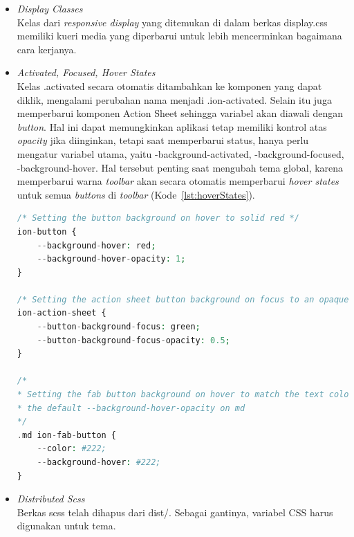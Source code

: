 \begin{enumerate}
\begin{itemize}
\begin{itemize}
			\item {\it Display Classes} \\ 
			Kelas dari {\it responsive display} yang ditemukan di dalam berkas display.css memiliki kueri media yang diperbarui untuk lebih mencerminkan bagaimana cara kerjanya.

			\item {\it Activated, Focused, Hover States} \\
			Kelas .activated secara otomatis ditambahkan ke komponen yang dapat diklik, mengalami perubahan nama menjadi .ion-activated. Selain itu juga memperbarui komponen Action Sheet sehingga variabel akan diawali dengan {\it button}. Hal ini dapat memungkinkan aplikasi tetap memiliki kontrol atas {\it opacity} jika diinginkan, tetapi saat memperbarui status, hanya perlu mengatur variabel utama, yaitu -background-activated, -background-focused, -background-hover. Hal tersebut penting saat mengubah tema global, karena memperbarui warna {\it toolbar} akan secara otomatis memperbarui {\it hover states} untuk semua {\it buttons} di {\it toolbar} (Kode~\ref{lst:hoverStates}). 
		\begin{lstlisting}[language=php, label={lst:hoverStates}, caption=Contoh Kode {\it Hover States} pada Ionic 5]
/* Setting the button background on hover to solid red */
ion-button {
	--background-hover: red;
	--background-hover-opacity: 1;
}

/* Setting the action sheet button background on focus to an opaque green */
ion-action-sheet {
	--button-background-focus: green;
	--button-background-focus-opacity: 0.5;
}

/*
* Setting the fab button background on hover to match the text color with
* the default --background-hover-opacity on md
*/
.md ion-fab-button {
	--color: #222;
	--background-hover: #222;
}
		\end{lstlisting} 

			\item {\it Distributed Scss} \\
			Berkas scss telah dihapus dari dist/. Sebagai gantinya, variabel CSS harus digunakan untuk tema.

		\end{itemize}


\end{itemize}
\end{enumerate}
